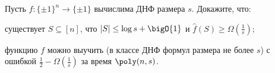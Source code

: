 Пусть $f\colon \{\pm 1\}^n \to \{\pm 1\}$ вычислима ДНФ размера $s$. Докажите, что:
\begin{enumcyr}
    \item существует $S \subseteq [n]$, что $|S| \le \log s + \bigO{1}$ и $\hat{f}(S) \ge
        \Omega\left(\frac{1}{s} \right)$;
    \item функцию $f$ можно выучить (в классе ДНФ формул размера не более $s$) с ошибкой $\frac{1}{2} -
        \Omega\left(\frac{1}{s} \right)$ за время $\poly(n, s)$.
\end{enumcyr}
